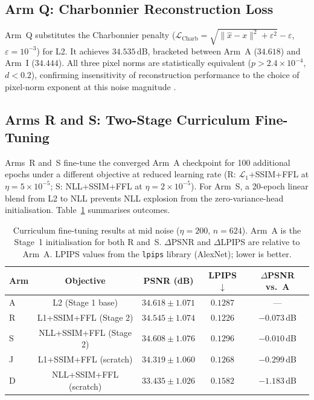 \documentclass[12pt, a4paper, twoside, openright]{book}
\begin{document}
\subsection{Arm Q: Charbonnier Reconstruction Loss}
\label{sec:results:curriculum:charb}

Arm~Q substitutes the Charbonnier penalty \cite{charbonnier_two_1994} ($\mathcal{L}_{\mathrm{Charb}} = \sqrt{\|\hat{x}-x\|^2+\varepsilon^2}-\varepsilon$, $\varepsilon=10^{-3}$) for L2. It achieves $34.535$\,dB, bracketed between Arm~A ($34.618$) and Arm~I ($34.444$). All three pixel norms are statistically equivalent ($p>2.4\times10^{-4}$, $d<0.2$), confirming insensitivity of reconstruction performance to the choice of pixel-norm exponent at this noise magnitude \cite{zhao_loss_2017}.

\subsection{Arms R and S: Two-Stage Curriculum Fine-Tuning}
\label{sec:results:curriculum:ft}

Arms~R and~S fine-tune the converged Arm~A checkpoint for 100 additional epochs under a different objective at reduced learning rate (R: $\mathcal{L}_1$+SSIM+FFL at $\eta=5\times10^{-5}$; S: NLL+SSIM+FFL at $\eta=2\times10^{-5}$). For Arm~S, a 20-epoch linear blend from L2 to NLL prevents NLL explosion from the zero-variance-head initialisation. Table~\ref{tab:results:curriculum:summary} summarises outcomes.

\begin{table}[htbp]
\centering
\caption[Curriculum fine-tuning results]{Curriculum fine-tuning results at mid noise ($\eta=200$, $n=624$). Arm~A is the Stage~1 initialisation for both R and~S. $\Delta$PSNR and $\Delta$LPIPS are relative to Arm~A. LPIPS values from the \texttt{lpips} library (AlexNet); lower is better.}
\label{tab:results:curriculum:summary}
\small
\begin{tabular}{lcccc}
\toprule
\textbf{Arm} & \textbf{Objective} & \textbf{PSNR (dB)} & \textbf{LPIPS $\downarrow$} & \textbf{$\Delta$PSNR vs.~A} \\
\midrule
A  & L2 (Stage 1 base)      & $34.618 \pm 1.071$ & $0.1287$ & --- \\
R  & L1+SSIM+FFL (Stage 2)  & $34.545 \pm 1.074$ & $\mathbf{0.1226}$ & $-0.073$\,dB \\
S  & NLL+SSIM+FFL (Stage 2) & $34.608 \pm 1.076$ & $0.1296$ & $-0.010$\,dB \\
\midrule
J  & L1+SSIM+FFL (scratch)  & $34.319 \pm 1.060$ & $0.1268$ & $-0.299$\,dB \\
D  & NLL+SSIM+FFL (scratch) & $33.435 \pm 1.026$ & $0.1582$ & $-1.183$\,dB \\
\bottomrule
\end{tabular}
\end{table}
\end{document}
